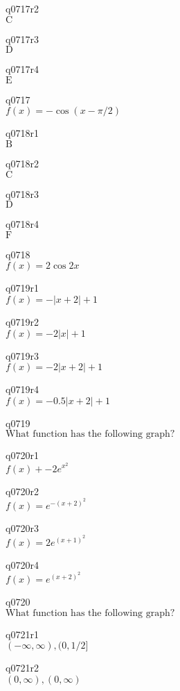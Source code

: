 q0717r2\\
\(\displaystyle \text{C} \)

q0717r3\\
\(\displaystyle \text{D} \)

q0717r4\\
\(\displaystyle \text{E} \)

q0717\\
\(\displaystyle f(x) = -\cos(x - \pi/2) \)

q0718r1\\
\(\displaystyle \text{B} \)

q0718r2\\
\(\displaystyle \text{C} \)

q0718r3\\
\(\displaystyle \text{D} \)

q0718r4\\
\(\displaystyle \text{F} \)

q0718\\
\(\displaystyle f(x) = 2\cos 2x \)

q0719r1\\
\(\displaystyle f(x) = -|x+2| + 1 \)

q0719r2\\
\(\displaystyle f(x) = -2|x| + 1 \)

q0719r3\\
\(\displaystyle f(x) = -2|x+2| + 1 \)

q0719r4\\
\(\displaystyle f(x) = -0.5|x+2| + 1 \)

q0719\\
\(\displaystyle \text{What function has the following graph?} \)

q0720r1\\
\(\displaystyle f(x) + -2e^{x^2} \)

q0720r2\\
\(\displaystyle f(x) = e^{-(x+2)^2} \)

q0720r3\\
\(\displaystyle f(x) = 2e^{(x+1)^2} \)

q0720r4\\
\(\displaystyle f(x) = e^{(x+2)^2} \)

q0720\\
\(\displaystyle \text{What function has the following graph?} \)

q0721r1\\
\(\displaystyle (-\infty, \infty), (0, 1/2] \)

q0721r2\\
\(\displaystyle (0,\infty), (0, \infty) \)

